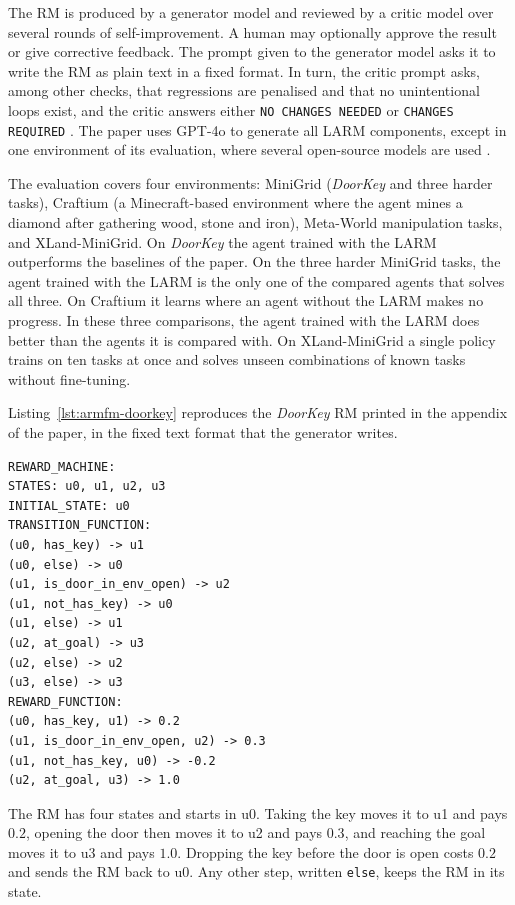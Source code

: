 \documentclass[11pt,english,listoffigures,listoftables]{tfgetsinf}
\newcommand{\env}[1]{\textsf{\slshape #1}}  %
\begin{document}
The RM is produced by a generator model and reviewed by a critic model over several rounds of self-improvement. A human may optionally approve the result or give corrective feedback. The prompt given to the generator model asks it to write the RM as plain text in a fixed format. In turn, the critic prompt asks, among other checks, that regressions are penalised and that no unintentional loops exist, and the critic answers either \texttt{NO CHANGES NEEDED} or \texttt{CHANGES REQUIRED} \cite[pp.~26--27]{creus2026armfm}. The paper uses GPT-4o to generate all LARM components, except in one environment of its evaluation, where several open-source models are used \cite[p.~4]{creus2026armfm}.

The evaluation covers four environments: MiniGrid (\env{DoorKey} and three harder tasks), Craftium (a Minecraft-based environment where the agent mines a diamond after gathering wood, stone and iron), Meta-World manipulation tasks, and XLand-MiniGrid. On \env{DoorKey} the agent trained with the LARM outperforms the baselines of the paper. On the three harder MiniGrid tasks, the agent trained with the LARM is the only one of the compared agents that solves all three. On Craftium it learns where an agent without the LARM makes no progress. In these three comparisons, the agent trained with the LARM does better than the agents it is compared with. On XLand-MiniGrid a single policy trains on ten tasks at once and solves unseen combinations of known tasks without fine-tuning.

Listing~\ref{lst:armfm-doorkey} reproduces the \env{DoorKey} RM printed in the appendix of the paper, in the fixed text format that the generator writes.

\noindent\begin{minipage}{\linewidth}
\begin{lstlisting}[style=rm,caption={The \env{DoorKey} RM printed by ARM-FM (page 30 of the paper).},label={lst:armfm-doorkey}]
REWARD_MACHINE:
STATES: u0, u1, u2, u3
INITIAL_STATE: u0
TRANSITION_FUNCTION:
(u0, has_key) -> u1
(u0, else) -> u0
(u1, is_door_in_env_open) -> u2
(u1, not_has_key) -> u0
(u1, else) -> u1
(u2, at_goal) -> u3
(u2, else) -> u2
(u3, else) -> u3
REWARD_FUNCTION:
(u0, has_key, u1) -> 0.2
(u1, is_door_in_env_open, u2) -> 0.3
(u1, not_has_key, u0) -> -0.2
(u2, at_goal, u3) -> 1.0
\end{lstlisting}
\end{minipage}

The RM has four states and starts in u0. Taking the key moves it to u1 and pays $0.2$, opening the door then moves it to u2 and pays $0.3$, and reaching the goal moves it to u3 and pays $1.0$. Dropping the key before the door is open costs $0.2$ and sends the RM back to u0. Any other step, written \texttt{else}, keeps the RM in its state.
\end{document}
